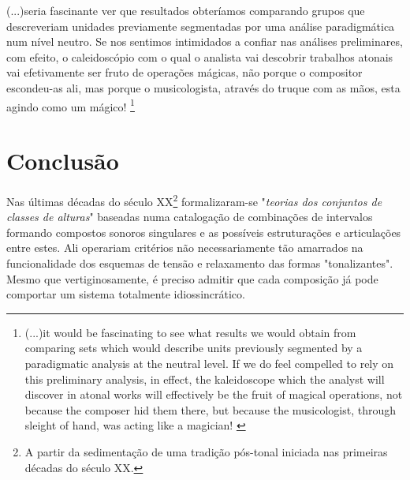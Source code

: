 \documentclass[
	12pt,				%
	openright,			%
	twoside,			%
	a4paper,			%
	english,			%
	french,				%
	spanish,			%
	brazil				%
	]{abntex2}
\begin{document}
\begin{citacao}
(...)seria fascinante ver que resultados obteríamos comparando grupos que descreveriam unidades previamente segmentadas por uma análise paradigmática num nível neutro. Se nos sentimos intimidados a confiar nas análises preliminares, com efeito, o caleidoscópio com o qual o analista vai descobrir trabalhos atonais vai efetivamente ser fruto de operações mágicas, não porque o compositor escondeu-as ali, mas porque o musicologista, através do truque com as mãos, esta agindo como um mágico! \cite[ p. 16]{nattiez2003allen}\footnote{(...)it would be fascinating to see what results we would obtain from comparing sets which would describe units previously segmented by a paradigmatic analysis at the neutral level. If we do feel compelled to rely on this preliminary analysis, in effect, the kaleidoscope which the analyst will discover in atonal works will effectively be the fruit of magical operations, not because the composer hid them there, but because the musicologist, through sleight of hand, was acting like a magician!
\cite[ p. 16]{nattiez2003allen}}
\end{citacao}









\chapter*[Conclusão]{Conclusão}
\label{conclusao}

Nas últimas décadas do século XX\footnote{A partir da sedimentação de uma tradição pós-tonal iniciada nas primeiras décadas do século XX.} formalizaram-se "\textit{teorias dos conjuntos de classes de alturas}"\cite{forte1973structure,rahn1980basic,perle1990pitch,straus2004} baseadas numa catalogação de combinações de intervalos formando compostos sonoros singulares e as possíveis estruturações e articulações entre estes. Ali operariam critérios não necessariamente tão amarrados na funcionalidade dos esquemas de tensão e relaxamento das formas "tonalizantes". Mesmo que vertiginosamente, é preciso admitir que cada composição já pode comportar um sistema totalmente idiossincrático. 
\end{document}
